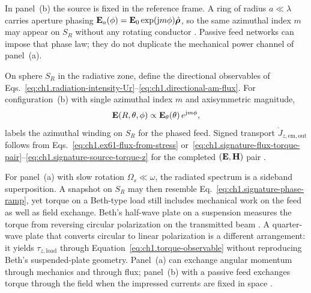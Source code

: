 In panel~(b) the source is fixed in the reference frame. A ring of radius \(a\ll\lambda\) carries aperture phasing \(\mathbf{E}_a(\phi)=\mathbf{E}_0\exp(\mathrm{j} m\phi)\hat{\boldsymbol{\rho}}\), so the same azimuthal index \(m\) may appear on $S_R$ without any rotating conductor \cite{harrington2001}. Passive feed networks can impose that phase law; they do not duplicate the mechanical power channel of panel~(a).

On sphere \(S_R\) in the radiative zone, define the directional observables of
Eqs.~\eqref{eq:ch1.radiation-intensity-Ur}--\eqref{eq:ch1.directional-am-flux}.
For configuration~(b) with single azimuthal index \(m\) and axisymmetric magnitude,
\begin{equation}
\label{eq:ch1.signature-phase-ramp}
\mathbf{E}(R,\theta,\phi)\propto \mathbf{E}_\theta(\theta)\,e^{\mathrm{j} m\phi},
\end{equation}
labels the azimuthal winding on $S_R$ for the phased feed. Signed transport $\dot J_{z,\mathrm{em,out}}$ follows from Eqs.~\eqref{eq:ch1.ex61-flux-from-stress} or~\eqref{eq:ch1.signature-flux-torque-pair}--\eqref{eq:ch1.signature-source-torque-z} for the completed $(\mathbf{E},\mathbf{H})$ pair \cite{stratton1941,allen1992}.

For panel~(a) with slow rotation \(\Omega_s\ll\omega\), the radiated spectrum is a sideband superposition. A snapshot on \(S_R\) may then resemble Eq.~\eqref{eq:ch1.signature-phase-ramp}, yet torque on a Beth-type load still includes mechanical work on the feed as well as field exchange. Beth's half-wave plate on a suspension measures the torque from reversing circular polarization on the transmitted beam \cite{beth1936}. A quarter-wave plate that converts circular to linear polarization is a different arrangement: it yields \(\tau_{z,\mathrm{load}}\) through Equation~\eqref{eq:ch1.torque-observable} without reproducing Beth's suspended-plate geometry. Panel~(a) can exchange angular momentum through mechanics and through flux; panel~(b) with a passive feed exchanges torque through the field when the impressed currents are fixed in space \cite{stratton1941}.

